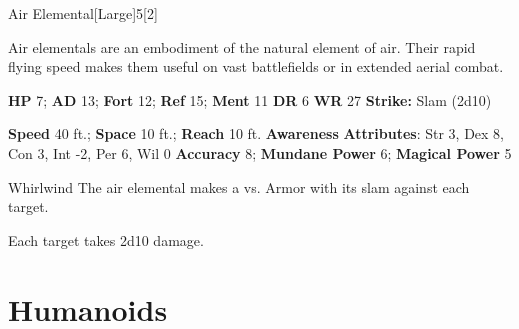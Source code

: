   \begin{monsection}{Air Elemental}[Large]{5}[2]
    \vspace{-1em}\vspace{-1em}
    \vspace{0em}

    
    Air elementals are an embodiment of the natural element of air.
    Their rapid flying speed makes them useful on vast battlefields or in extended aerial combat.
  

    \begin{spellcontent}
      \begin{spelltargetinginfo}
        \pari \textbf{HP} 7;
          \textbf{AD} 13;
          \textbf{Fort} 12;
          \textbf{Ref} 15;
          \textbf{Ment} 11
        \pari \textbf{DR} 6
        \pari \textbf{WR} 27
        \pari \textbf{Strike:}
            Slam  (2d10)
      \end{spelltargetinginfo}
    \end{spellcontent}
    \begin{monsterfooter}
      \pari \textbf{Speed} 40 ft.;
        \textbf{Space} 10 ft.;
        \textbf{Reach} 10 ft.
      \pari \textbf{Awareness} 
      \pari \textbf{Attributes}:
        Str 3, Dex 8,
        Con 3, Int -2,
        Per 6, Wil 0
      \pari \textbf{Accuracy} 8;
        \textbf{Mundane Power} 6;
      \textbf{Magical Power} 5
    \end{monsterfooter}
  \end{monsection}
  \begin{freeability}{Whirlwind}
       The air elemental makes a 
         vs. Armor
        with its slam against each target.
    
    \hit Each target takes 2d10  damage.
    \end{freeability}
  
        \section{Humanoids}
      
